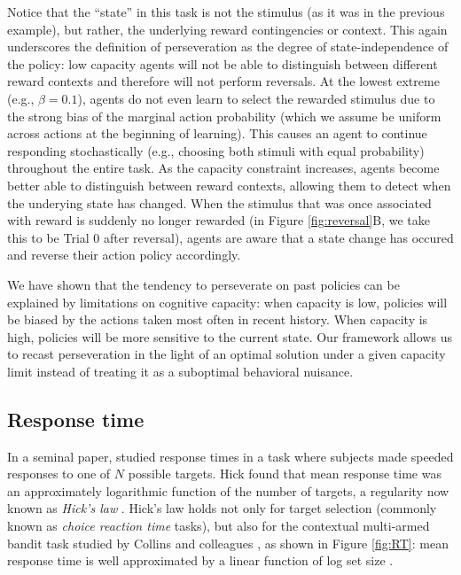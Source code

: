 \documentclass[11pt]{article}
\begin{document}
Notice that the ``state'' in this task is not the stimulus (as it was in the previous example), but rather, the underlying reward contingencies or context. This again underscores the definition of perseveration as the degree of state-independence of the policy: low capacity agents will not be able to distinguish between different reward contexts and therefore will not perform reversals. At the lowest extreme (e.g., $\beta = 0.1$), agents do not even learn to select the rewarded stimulus due to the strong bias of the marginal action probability (which we assume be uniform across actions at the beginning of learning). This causes an agent to continue responding stochastically (e.g., choosing both stimuli with equal probability) throughout the entire task. As the capacity constraint increases, agents become better able to distinguish between reward contexts, allowing them to detect when the underying state has changed. When the stimulus that was once associated with reward is suddenly no longer rewarded (in Figure \ref{fig:reversal}B, we take this to be Trial 0 after reversal), agents are aware that a state change has occured and reverse their action policy accordingly. 

We have shown that the tendency to perseverate on past policies can be explained by limitations on cognitive capacity: when capacity is low, policies will be biased by the actions taken most often in recent history. When capacity is high, policies will be more sensitive to the current state. Our framework allows us to recast perseveration in the light of an optimal solution under a given capacity limit instead of treating it as a suboptimal behavioral nuisance.

\subsection{Response time}

In a seminal paper, \citet{hick52} studied response times in a task where subjects made speeded responses to one of $N$ possible targets. Hick found that mean response time was an approximately logarithmic function of the number of targets, a regularity now known as \emph{Hick's law} \citep[see][for a recent review]{proctor18}. Hick's law holds not only for target selection (commonly known as \emph{choice reaction time} tasks), but also for the contextual multi-armed bandit task studied by Collins and colleagues \citep{collins12,collins14,collins18}, as shown in Figure \ref{fig:RT}: mean response time is well approximated by a linear function of log set size \citep[see also][for more detailed analyses of response times in this task]{mcdougle20}.
\end{document}
